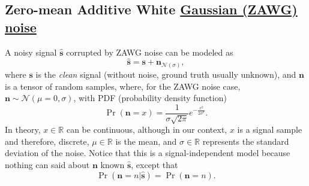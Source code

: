\documentclass{article}
\begin{document}

\subsection{Zero-mean Additive White \href{https://en.wikipedia.org/wiki/Gaussian_noise}{Gaussian (ZAWG) noise}}

A noisy signal $\hat{\mathbf s}$ corrupted by ZAWG noise can be modeled as
\begin{equation}
  \hat{\mathbf s} = {\mathbf s} + {\mathbf n}_{{\mathcal N}(\sigma)},
  \label{eq:AWG_noise_model}  
\end{equation}
where $\mathbf{s}$ is the \emph{clean} signal (without noise, ground
truth usually unknown),
and ${\mathbf n}$ is a tensor of random samples,
where, for the ZAWG noise case,
${\mathbf n}\sim{\mathcal N}(\mu=0,\sigma)$, with PDF (probability density
function)
\begin{equation}
  \Pr({\mathbf n}{=}x) = \frac 1 {\sigma\sqrt{2\pi}} e^{-\frac{x^2}{2\sigma^2} }.
\end{equation}
In theory, $x\in\mathbb{R}$ can be continuous, although in our
context, $x$ is a signal sample and therefore, discrete,
$\mu\in\mathbb{R}$ is the mean, and $\sigma\in\mathbb{R}$ represents
the standard deviation of the noise. Notice that this is a
signal-independent model because nothing can said about ${\mathbf n}$
known $\hat{\mathbf s}$, except that
\begin{equation}
  \Pr(\mathbf{n}{=}n|\hat{\mathbf{s}}) = \Pr(\mathbf{n}{=}n).
\end{equation}
\end{document}
